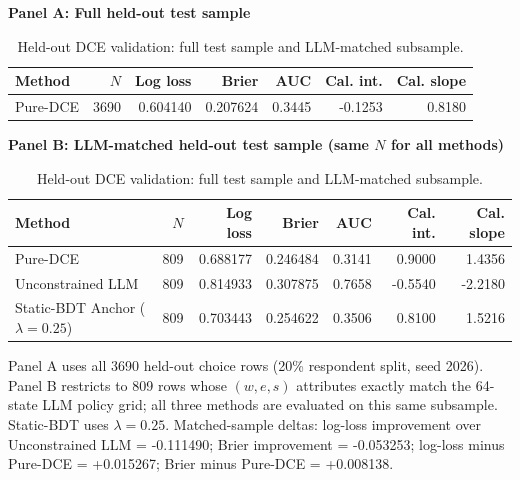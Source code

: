 \begin{table}[t]
\centering
\caption{Held-out DCE validation: full test sample and LLM-matched subsample.}
\label{tab:heldout-dce-matched}
\small
\textbf{Panel A: Full held-out test sample}\\
\begin{tabular}{l r r r r r r}
\toprule
Method & $N$ & Log loss & Brier & AUC & Cal. int. & Cal. slope \\
\midrule
Pure-DCE & 3690 & 0.604140 & 0.207624 & 0.3445 & -0.1253 & 0.8180 \\
\bottomrule
\end{tabular}

\vspace{0.6em}
\textbf{Panel B: LLM-matched held-out test sample (same $N$ for all methods)}\\
\begin{tabular}{l r r r r r r}
\toprule
Method & $N$ & Log loss & Brier & AUC & Cal. int. & Cal. slope \\
\midrule
Pure-DCE & 809 & 0.688177 & 0.246484 & 0.3141 & 0.9000 & 1.4356 \\
Unconstrained LLM & 809 & 0.814933 & 0.307875 & 0.7658 & -0.5540 & -2.2180 \\
Static-BDT Anchor ($\lambda=0.25$) & 809 & 0.703443 & 0.254622 & 0.3506 & 0.8100 & 1.5216 \\
\bottomrule
\end{tabular}

\vspace{0.4em}
\begin{minipage}{0.92\textwidth}
\footnotesize
Panel A uses all 3690 held-out choice rows (20\% respondent split, seed 2026). Panel B restricts to 809 rows whose $(w,e,s)$ attributes exactly match the 64-state LLM policy grid; all three methods are evaluated on this same subsample. Static-BDT uses $\lambda=0.25$. Matched-sample deltas: log-loss improvement over Unconstrained LLM = -0.111490; Brier improvement = -0.053253; log-loss minus Pure-DCE = +0.015267; Brier minus Pure-DCE = +0.008138.
\end{minipage}
\end{table}
